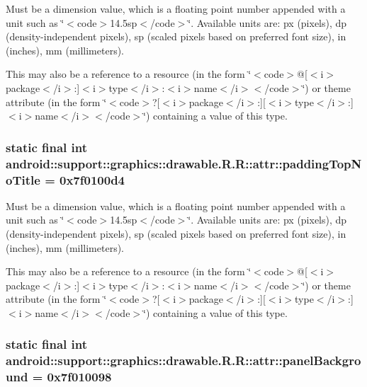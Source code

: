Must be a dimension value, which is a floating point number appended with a unit such as \char`\"{}$<$code$>$14.5sp$<$/code$>$\char`\"{}. Available units are: px (pixels), dp (density-independent pixels), sp (scaled pixels based on preferred font size), in (inches), mm (millimeters). 

This may also be a reference to a resource (in the form \char`\"{}$<$code$>$@\mbox{[}$<$i$>$package$<$/i$>$:\mbox{]}$<$i$>$type$<$/i$>$:$<$i$>$name$<$/i$>$$<$/code$>$\char`\"{}) or theme attribute (in the form \char`\"{}$<$code$>$?\mbox{[}$<$i$>$package$<$/i$>$:\mbox{]}\mbox{[}$<$i$>$type$<$/i$>$:\mbox{]}$<$i$>$name$<$/i$>$$<$/code$>$\char`\"{}) containing a value of this type. \hypertarget{classandroid_1_1support_1_1graphics_1_1drawable_1_1_r_1_1attr_f83f52938cb89233320a3e16b0d23df3}{
\subsubsection[{paddingTopNoTitle}]{\setlength{\rightskip}{0pt plus 5cm}static final int android::support::graphics::drawable.R.R::attr::paddingTopNoTitle = 0x7f0100d4}}
\label{classandroid_1_1support_1_1graphics_1_1drawable_1_1_r_1_1attr_f83f52938cb89233320a3e16b0d23df3}


Must be a dimension value, which is a floating point number appended with a unit such as \char`\"{}$<$code$>$14.5sp$<$/code$>$\char`\"{}. Available units are: px (pixels), dp (density-independent pixels), sp (scaled pixels based on preferred font size), in (inches), mm (millimeters). 

This may also be a reference to a resource (in the form \char`\"{}$<$code$>$@\mbox{[}$<$i$>$package$<$/i$>$:\mbox{]}$<$i$>$type$<$/i$>$:$<$i$>$name$<$/i$>$$<$/code$>$\char`\"{}) or theme attribute (in the form \char`\"{}$<$code$>$?\mbox{[}$<$i$>$package$<$/i$>$:\mbox{]}\mbox{[}$<$i$>$type$<$/i$>$:\mbox{]}$<$i$>$name$<$/i$>$$<$/code$>$\char`\"{}) containing a value of this type. \hypertarget{classandroid_1_1support_1_1graphics_1_1drawable_1_1_r_1_1attr_c8f0141790c979d80aa44463cee1d22e}{
\subsubsection[{panelBackground}]{\setlength{\rightskip}{0pt plus 5cm}static final int android::support::graphics::drawable.R.R::attr::panelBackground = 0x7f010098}}
\label{classandroid_1_1support_1_1graphics_1_1drawable_1_1_r_1_1attr_c8f0141790c979d80aa44463cee1d22e}


